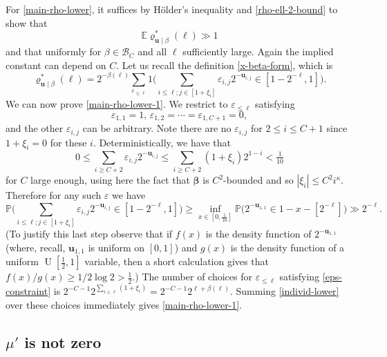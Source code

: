 \documentclass[11pt,reqno]{amsart}
\numberwithin{equation}{section}
\theoremstyle{definition}
\theoremstyle{remark}
\newcommand{\mb}{\mathbb}
\newcommand{\mbf}{\mathbf}
\newcommand{\eps}{\varepsilon}
\def\boldbeta{\boldsymbol\beta}
\renewcommand{\le}{\leqslant}
\renewcommand{\ge}{\geqslant}
\begin{document}
For \cref{main-rho-lower}, it suffices by H\"older's inequality and \cref{rho-ell-2-bound} to show that 
\begin{equation}\label{main-rho-lower-1} \mb{E} \varrho^*_{\mbf{u} \mid \beta}(\ell) \gg 1\end{equation} and that 
uniformly for $\beta \in \mathscr{B}_C$ and all $\ell$ sufficiently large. Again the implied constant can depend on $C$. Let us recall the definition \cref{x-beta-form}, which is \begin{equation*}\varrho^*_{\mbf{u} \mid \beta}(\ell)  = 2^{-\beta(\ell)} \sum_{\eps_{\le \ell}} 1 \Big( \sum_{i \le \ell; j \in [1 + \xi_i]} \eps_{i,j}2^{-\mbf{u}_{i, j}} \in [1 - 2^{-\ell},1]\Big).\end{equation*} 
We can now prove \cref{main-rho-lower-1}. We restrict to $\eps_{\le \ell}$ satisfying \begin{equation}\label{eps-constraint} \eps_{1,1} = 1,\, \eps_{1,2} = \cdots = \eps_{1, C+1} = 0,\end{equation} and the other $\eps_{i,j}$ can be arbitrary. Note there are no $\eps_{i,j}$ for $2 \le i \le C + 1$ since $1 + \xi_i = 0$ for these $i$. Deterministically, we have that
\[ 0 \le  \sum_{i \ge C+2} \eps_{i,j} 2^{-\mbf{u}_{i,j}} \le \sum_{i \ge C+2} (1 + \xi_i) 2^{1 - i} < \tfrac{1}{10}\] for $C$ large enough, using here the fact that $\boldbeta$ is $C^2$-bounded and so $|\xi_i| \le C^2 i^{\kappa}$. Therefore for any such $\eps$ we have
\begin{equation}\label{individ-lower} \mb{P}\big( \sum_{i \le \ell; j \in [1 + \xi_i]} \eps_{i,j}2^{-\mbf{u}_{i, j}} \in [1 - 2^{-\ell},1]\big) \ge \inf_{x \in [0,\frac{1}{10}]} \mb{P} (2^{-\mbf{u}_{1,1}}  \in 1 - x- [2^{-\ell}]\big) \gg 2^{-\ell}.\end{equation}
(To justify this last step observe that if $f(x)$ is the density function of $2^{-\mbf{u}_{1,1}}$ (where, recall, $\mbf{u}_{1,1}$ is uniform on $[0,1]$) and $g(x)$ is the density function of a uniform $\operatorname{U}[\frac{1}{2},1]$ variable, then a short calculation gives that $f(x)/g(x) \ge 1/2\log 2 > \frac{1}{2}$.) The number of choices for $\eps_{\le \ell}$ satisfying \cref{eps-constraint} is $2^{-C - 1} 2^{\sum_{i \le \ell}(1 + \xi_i)} = 2^{-C - 1} 2^{\ell + \beta(\ell)}$. Summing \cref{individ-lower} over these choices immediately gives \cref{main-rho-lower-1}.\vspace*{8pt}

\subsection{$\mu'$ is not zero}\label{mu-prime-not-zero}
\end{document}
